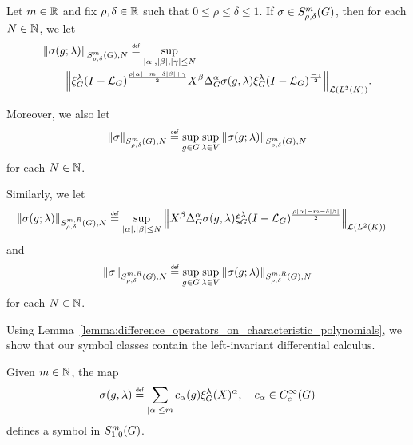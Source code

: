 \begin{definition}
\label{definition:symbol_semi-norms}
    Let $m \in \mathbb{R}$ and fix $\rho, \delta \in \mathbb{R}$ such that $0 \leq \rho \leq \delta \leq 1$.
    If $\sigma \in S^{m}_{\rho, \delta}(G)$,
    then for each $N \in \mathbb{N}$,
    we let
    \begin{align*}
        &\SymbolSemiNorm m {\rho, \delta} N {\sigma(g; \lambda)}
        \defeq
        \sup_{\abs \alpha, \abs \beta, \abs \gamma \leq N}
        \\
        &\qquad
        \norm [\Lin{\Lebesgue 2 \CompactGroup}] {%
            \Rep{\lambda} \BesselPotential{\rho \abs\alpha - m - \delta \abs\beta + \gamma} \LeftDifferentialOperator{\beta} \DifferenceOperatorOrder{\alpha} \sigma(g, \lambda) \Rep{\lambda} \BesselPotential{-\gamma}
        }.
    \end{align*}

    Moreover, we also let
    \begin{align*}
        \SymbolSemiNorm m {\rho, \delta} N \sigma
        \defeq \sup_{g \in \Group} \sup_{\lambda \in \VectorSpace}
        \SymbolSemiNorm m {\rho, \delta} N {\sigma(g; \lambda)}
    \end{align*}
    for each $N \in \mathbb{N}$.

    Similarly,
    we let
    \begin{align*}
        &\SymbolSemiNorm {m, R} {\rho, \delta} N {\sigma(g; \lambda)}
        \defeq
        \sup_{\abs \alpha, \abs \beta \leq N}
        \norm [\Lin{\Lebesgue 2 \CompactGroup}] {%
            \LeftDifferentialOperator{\beta} \DifferenceOperatorOrder{\alpha} \sigma(g, \lambda)
            \Rep{\lambda} \BesselPotential{\rho \abs\alpha - m - \delta \abs\beta}
        }
    \end{align*}
    and
    \begin{align*}
        \SymbolSemiNorm {m, R} {\rho, \delta} N \sigma
        \defeq \sup_{g \in \Group} \sup_{\lambda \in \VectorSpace}
        \SymbolSemiNorm {m, R} {\rho, \delta} N {\sigma(g; \lambda)}
    \end{align*}
    for each $N \in \mathbb{N}$.
\end{definition}

Using Lemma~\ref{lemma:difference_operators_on_characteristic_polynomials},
we show that our symbol classes contain the left-invariant differential calculus.

\begin{example}
    Given $m \in \mathbb{N}$,
    the map
    \begin{align*}
        \sigma(g, \lambda) \defeq \sum_{\abs \alpha \leq m} c_\alpha(g) \Rep \lambda(X)^\alpha,
        \quad c_\alpha \in C^\infty_c(\Group)
    \end{align*}
    defines a symbol in $S^{m}_{1, 0}(G)$.
\end{example}

